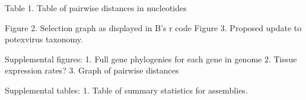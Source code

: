 \documentclass[fleqn,10pt,lineno]{wlpeerj}
\begin{document}
Table 1. Table of pairwise distances in nucleotides

Figure 2. Selection graph as displayed in B's r code
Figure 3. Proposed update to potexvirus taxonomy.

Supplemental figures:
1. Full gene phylogenies for each gene in genome
2. Tissue expression rates?
3. Graph of pairwise distances

Supplemental tables:
1. Table of summary statistics for assemblies.


\end{document}
